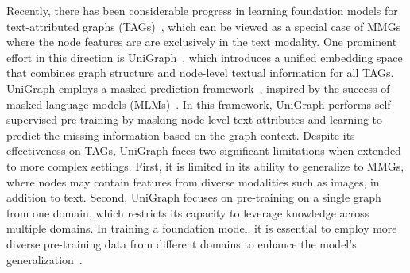 
Recently, there has been considerable progress in learning foundation models for text-attributed graphs (TAGs)~\cite{he2024unigraphlearningunifiedcrossdomain,he2024g,heharnessing,chiennode}, which can be viewed as a special case of MMGs where the node features are are exclusively in the text modality.
One prominent effort in this direction is UniGraph~\cite{he2024unigraphlearningunifiedcrossdomain}, which introduces a unified embedding space that combines graph structure and node-level textual information for all TAGs. UniGraph employs a masked prediction framework~\cite{he2022masked,kenton2019bert,radford2018improving}, inspired by the success of masked language models (MLMs)~\cite{kenton2019bert}. In this framework, UniGraph performs self-supervised pre-training by masking node-level text attributes and learning to predict the missing information based on the graph context. 
Despite its effectiveness on TAGs, UniGraph faces two significant limitations when extended to more complex settings. First, it is limited in its ability to generalize to MMGs, where nodes may contain features from diverse modalities such as images, in addition to text. 
Second, UniGraph focuses on pre-training on a single graph from one domain, which restricts its capacity to leverage knowledge across multiple domains. 
In training a foundation model, it is essential to employ more diverse pre-training data from different domains to enhance the model's generalization~\cite{radford2021learning,achiam2023gpt,girdhar2023imagebind}.

